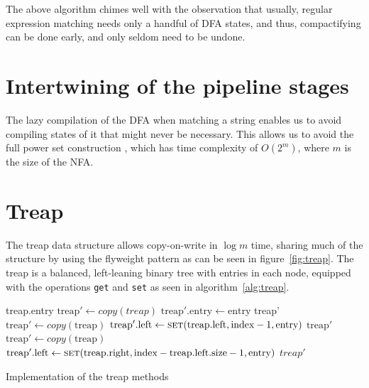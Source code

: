 \documentclass[11pt]{Thesis}
\theoremstyle{definition}
\newcommand{\Figref}[1]{figure~\ref{fig:#1}}
\newcommand{\seclabel}[1]{\label{sec:#1}}
\begin{document}
The above algorithm chimes well with the observation that usually,
regular expression matching needs only a handful of DFA states, and thus,
compactifying can be done early, and only seldom need to be undone.

\section{Intertwining of the pipeline stages}
The lazy compilation of the DFA when matching a string enables us
to avoid compiling states of it that might never be necessary. This
allows us to avoid the full power set construction \cite{Sips05a}, which has 
time complexity of $O(2^m)$, where $m$ is the size of the NFA.

\section{Treap}	\seclabel{treap}
The treap data structure allows copy-on-write in $\log m$ time, sharing
much of the structure by using the flyweight pattern as can be seen in
\Figref{treap}. The treap is a balanced, left-leaning binary tree with entries
in each node, equipped with the operations \texttt{get} and \texttt{set} as
seen in algorithm~\ref{alg:treap}.

\begin{algorithm*}
\begin{algorithmic}[1]
		\State \Return treap.entry
		\State \Return {}
	\Else
		\State \Return {}
	\EndIf
\EndFunction
\Statex
{}
		\State $\text{treap}'\gets copy(treap)$
		\State $\text{treap}'\text{.entry} \gets \text{entry}$
		\State \Return treap'
		\State $\text{treap}'\gets copy(\text{treap})$
		\State $\text{treap}'\text{.left} \gets \Call{set}{\text{treap.left}, \text{index}-1, \text{entry}}$
		\State \Return $\text{treap}'$
	\Else
		\State $\text{treap}'\gets copy(\text{treap})$
		\State $\text{treap}'\text{.left} \gets \Call{set}{\text{treap.right}, \text{index}-\text{treap.left.size}-1, \text{entry}}$
		\State \Return $treap'$
	\EndIf
\EndFunction
\end{algorithmic}
\caption{\label{alg:treap} Implementation of the treap methods}
\end{algorithm*}
\end{document}
